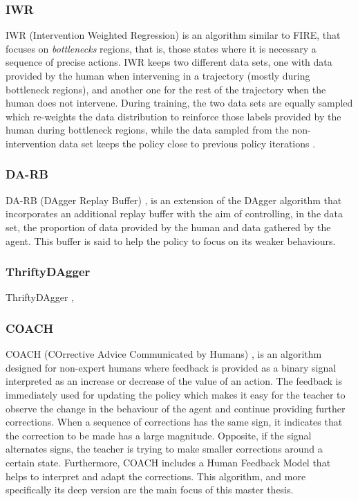 \subsubsection*{IWR}
IWR (Intervention Weighted Regression) \cite{IWR-mandlekar:2020} is an algorithm similar to FIRE, that focuses on \textit{bottlenecks} regions, that is, those states where it is necessary a sequence of precise actions. IWR keeps two different data sets, one with data provided by the human when intervening in a trajectory (mostly during bottleneck regions), and another one for the rest of the trajectory when the human does not intervene. During training, the two data sets are equally sampled which re-weights  the data distribution to reinforce those labels provided by the human  during bottleneck regions, while the data sampled from the non-intervention data set
keeps the policy close to previous policy iterations \cite{IWR-mandlekar:2020} .



\subsubsection*{DA-RB}
DA-RB (DAgger Replay Buffer) \cite{DA-RB-Prakash:2020}, is an extension of the DAgger algorithm \cite{DAgger-Ross:2011} that incorporates an additional replay buffer with the aim of controlling, in the data set, the proportion of data provided by the human and data gathered by the agent. This buffer is said to help the policy to focus on its weaker behaviours.

\subsubsection*{ThriftyDAgger}
ThriftyDAgger \cite{ThriftyDAgger}, 


 
 \subsubsection*{COACH}
COACH (COrrective Advice Communicated by Humans) \cite{COACH-Celemin-Ruiz-del-Solar:2015}, is an algorithm designed for non-expert humans where feedback is provided as a binary signal interpreted as an increase or decrease of the value of an action.  The feedback is immediately used for updating the policy which makes it easy for the teacher to observe the change in the behaviour of the agent and continue providing further corrections. When a sequence of corrections has the same sign, it indicates that the correction to be made has a large magnitude. Opposite, if the signal alternates signs, the teacher is trying to make smaller corrections around a certain state. Furthermore, COACH includes a Human Feedback Model that helps to interpret and adapt the corrections.
This algorithm, and more specifically its deep version \cite{D-COACH-Dattari-Celemin-Ruiz-del-Solar-Kober:2018} are the main focus of this master thesis.


